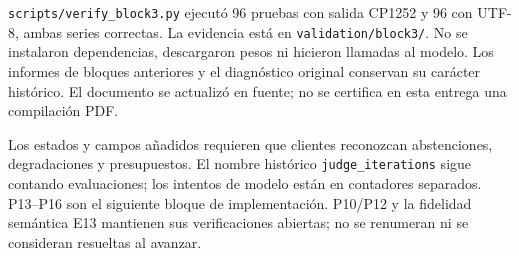 \texttt{scripts/verify\_block3.py} ejecutó 96 pruebas con salida CP1252 y 96 con
UTF-8, ambas series correctas. La evidencia está en \texttt{validation/block3/}.
No se instalaron dependencias, descargaron pesos ni hicieron llamadas al modelo.
Los informes de bloques anteriores y el diagnóstico original conservan su
carácter histórico. El documento se actualizó en fuente; no se certifica en esta
entrega una compilación PDF.

Los estados y campos añadidos requieren que clientes reconozcan abstenciones,
degradaciones y presupuestos. El nombre histórico \texttt{judge\_iterations}
sigue contando evaluaciones; los intentos de modelo están en contadores separados.
P13--P16 son el siguiente bloque de implementación. P10/P12 y la fidelidad
semántica E13 mantienen sus verificaciones abiertas; no se renumeran ni se
consideran resueltas al avanzar.
